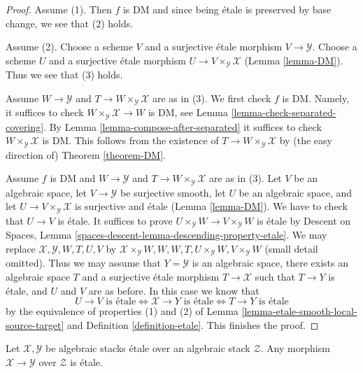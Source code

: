 \begin{proof}
Assume (1). Then $f$ is DM and since being \'etale is preserved
by base change, we see that (2) holds.

\medskip\noindent
Assume (2). Choose a scheme $V$ and a surjective \'etale morphism
$V \to \mathcal{Y}$. Choose a scheme $U$ and a surjective \'etale morphism
$U \to V \times_\mathcal{Y} \mathcal{X}$ (Lemma \ref{lemma-DM}).
Thus we see that (3) holds.

\medskip\noindent
Assume $W \to \mathcal{Y}$ and $T \to W \times_\mathcal{Y} \mathcal{X}$
are as in (3). We first check $f$ is DM. Namely, it suffices to check
$W \times_\mathcal{Y} \mathcal{X} \to W$ is DM, see
Lemma \ref{lemma-check-separated-covering}.
By Lemma \ref{lemma-compose-after-separated}
it suffices to check $W \times_\mathcal{Y} \mathcal{X}$ is DM.
This follows from the existence of $T \to W \times_\mathcal{Y} \mathcal{X}$
by (the easy direction of) Theorem \ref{theorem-DM}.

\medskip\noindent
Assume $f$ is DM and $W \to \mathcal{Y}$ and
$T \to W \times_\mathcal{Y} \mathcal{X}$ are as in (3).
Let $V$ be an algebraic space, let $V \to \mathcal{Y}$ be surjective smooth,
let $U$ be an algebraic space, and let
$U \to V \times_\mathcal{Y} \mathcal{X}$ is surjective and \'etale
(Lemma \ref{lemma-DM}). We have to check that $U \to V$ is \'etale.
It suffices to prove $U \times_\mathcal{Y} W \to V \times_\mathcal{Y} W$
is \'etale by Descent on Spaces, Lemma
\ref{spaces-descent-lemma-descending-property-etale}.
We may replace $\mathcal{X}, \mathcal{Y}, W, T, U, V$ by
$\mathcal{X} \times_\mathcal{Y} W, W, W, T, U \times_\mathcal{Y} W,
V \times_\mathcal{Y} W$ (small detail omitted).
Thus we may assume that $Y = \mathcal{Y}$ is an algebraic space, there exists
an algebraic space $T$ and a surjective \'etale morphism
$T \to \mathcal{X}$ such that $T \to Y$ is \'etale, and $U$ and $V$
are as before. In this case we know that
$$
U \to V\text{ is \'etale}
\Leftrightarrow
\mathcal{X} \to Y\text{ is \'etale}
\Leftrightarrow
T \to Y\text{ is \'etale}
$$
by the equivalence of properties (1) and (2) of
Lemma \ref{lemma-etale-smooth-local-source-target}
and Definition \ref{definition-etale}.
This finishes the proof.
\end{proof}

\begin{lemma}
\label{lemma-etale-permanence}
Let $\mathcal{X}, \mathcal{Y}$ be algebraic stacks \'etale over
an algebraic stack $\mathcal{Z}$. Any morphism
$\mathcal{X} \to \mathcal{Y}$ over $\mathcal{Z}$ is \'etale.
\end{lemma}

